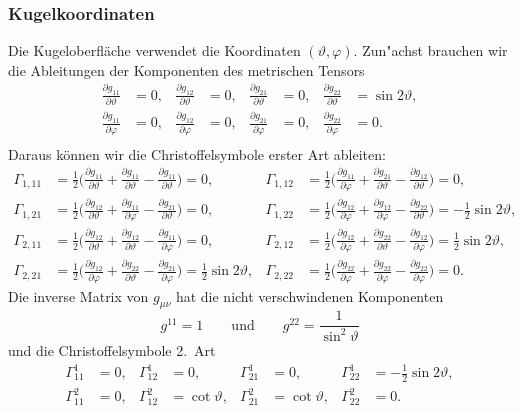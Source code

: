 \subsubsection{Kugelkoordinaten}
Die Kugeloberfläche verwendet die Koordinaten $(\vartheta,\varphi)$.
Zun"achst brauchen wir die Ableitungen der Komponenten des metrischen
Tensors
\begin{align*}
\frac{\partial g_{11}}{\partial \vartheta} &=0,
&
\frac{\partial g_{12}}{\partial \vartheta} &=0,
&
\frac{\partial g_{21}}{\partial \vartheta} &=0,
&
\frac{\partial g_{22}}{\partial \vartheta} &=\sin2\vartheta,
\\
\frac{\partial g_{11}}{\partial \varphi} &=0,
&
\frac{\partial g_{12}}{\partial \varphi} &=0,
&
\frac{\partial g_{21}}{\partial \varphi} &=0,
&
\frac{\partial g_{22}}{\partial \varphi} &=0.
\\
\end{align*}
Daraus können wir die Christoffelsymbole erster Art ableiten:
\begin{align*}
 \Gamma_{1,11}
&=
\frac12\biggl(\frac{\partial g_{11}}{\partial \vartheta}
	+ \frac{\partial g_{11}}{\partial \vartheta}
	- \frac{\partial g_{11}}{\partial \vartheta}\biggr)=0,
&\Gamma_{1,12}
&=
\frac12\biggl(\frac{\partial g_{11}}{\partial \varphi}
	+ \frac{\partial g_{21}}{\partial \vartheta}
	- \frac{\partial g_{12}}{\partial \vartheta}\biggr)=0,
\\
\Gamma_{1,21}
&=
\frac12\biggl(\frac{\partial g_{12}}{\partial \vartheta}
	+ \frac{\partial g_{11}}{\partial \varphi}
	- \frac{\partial g_{21}}{\partial \vartheta}\biggr)=0,
&\Gamma_{1,22}
&=
\frac12\biggl(\frac{\partial g_{12}}{\partial \varphi}
	+ \frac{\partial g_{12}}{\partial \varphi}
	- \frac{\partial g_{22}}{\partial \vartheta}\biggr)=-\frac12\sin2\vartheta,
\\
\Gamma_{2,11}
&=
\frac12\biggl(\frac{\partial g_{12}}{\partial \vartheta}
	+ \frac{\partial g_{12}}{\partial \vartheta}
	- \frac{\partial g_{11}}{\partial \varphi}\biggr)=0,
&\Gamma_{2,12}
&=
\frac12\biggl(\frac{\partial g_{12}}{\partial \varphi}
	+ \frac{\partial g_{22}}{\partial \vartheta}
	- \frac{\partial g_{12}}{\partial \varphi}\biggr)=\frac12\sin2\vartheta,
\\
\Gamma_{2,21}
&=
\frac12\biggl(\frac{\partial g_{12}}{\partial \varphi}
	+ \frac{\partial g_{22}}{\partial \vartheta}
	- \frac{\partial g_{21}}{\partial \varphi}\biggr)=\frac12\sin2\vartheta,
&\Gamma_{2,22}
&=
\frac12\biggl(\frac{\partial g_{22}}{\partial \varphi}
	+ \frac{\partial g_{22}}{\partial \varphi}
	- \frac{\partial g_{22}}{\partial \varphi}\biggr)=0.
\end{align*}
Die inverse Matrix von $g_{\mu\nu}$ hat die nicht verschwindenen
Komponenten
\[
g^{11} = 1
\qquad\text{und}\qquad
g^{22} = \frac1{\sin^2\vartheta}
\]
und die Christoffelsymbole 2.~Art
\begin{align*}
 \Gamma_{11}^1
&=0,
&\Gamma_{12}^1
&=0,
&\Gamma_{21}^1
&=0,
&\Gamma_{22}^1
&=-\frac12\sin2\vartheta,
\\
 \Gamma_{11}^2
&=0,
&\Gamma_{12}^2
&=\cot\vartheta,
&\Gamma_{21}^2
&=\cot\vartheta,
&\Gamma_{22}^2
&=0.
\end{align*}

